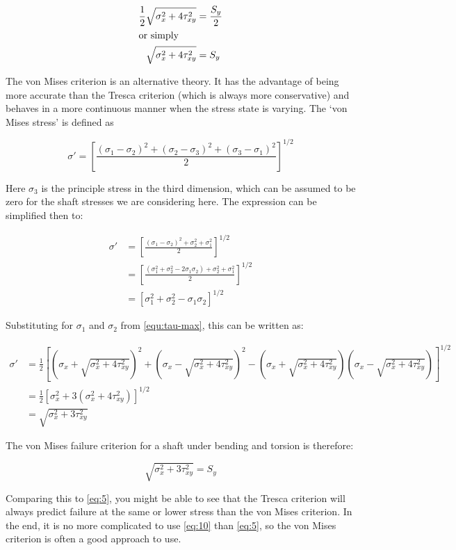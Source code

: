 \begin{align}
\label{eq:5}
\frac{1}{2} \sqrt{\sigma_x^2+4\tau_{xy}^2} &= \frac{S_y}{2} \\
              \intertext{or simply}
  \label{eq:tresca-failure}
\sqrt{\sigma_x^2+4\tau_{xy}^2} &= S_y
\end{align}

The von Mises criterion is an alternative
theory. It has the advantage of being more accurate than the Tresca criterion
(which is always more conservative) and behaves in a more continuous manner when
the stress state is varying. The `von Mises stress' is defined as

\begin{equation}
\label{eq:7}
\sigma' = \left[ \frac{ 
    \left( \sigma_1 - \sigma_2 \right)^2 +
    \left( \sigma_2 - \sigma_3 \right)^2 +
    \left( \sigma_3 - \sigma_1 \right)^2
  }{2} \right]^{1/2}
\end{equation}

Here $\sigma_3$ is the principle stress in the third dimension, which can be
assumed to be zero for the shaft stresses we are considering here. The
expression can be simplified then to:

\begin{align}
\label{eq:9}
  \sigma' &= \left[ \frac{ 
  \left( \sigma_1 - \sigma_2 \right)^2 + \sigma_2^2 + \sigma_1^2
  }{2} \right]^{1/2} \\
&= \left[ \frac{\left( \sigma_1^2 + \sigma_2^2 - 2 \sigma_1\sigma_2 \right) + \sigma_2^2 + \sigma_1^2}{2} \right]^{1/2} \\
          &= \left[ \sigma_1^2 + \sigma_2^2 - \sigma_1\sigma_2 \right]^{1/2} 
\end{align}

Substituting for $\sigma_1$ and $\sigma_2$ from \cref{equ:tau-max}, this can be written
as:

\begin{align}
\sigma' &= \frac{1}{2} \left[
          \left( \sigma_x + \sqrt{\sigma_x^2+4\tau_{xy}^2} \right)^2 +
          \left( \sigma_x - \sqrt{\sigma_x^2+4\tau_{xy}^2} \right)^2 -
          \left( \sigma_x + \sqrt{\sigma_x^2+4\tau_{xy}^2} \right)
          \left( \sigma_x - \sqrt{\sigma_x^2+4\tau_{xy}^2} \right)
          \right]^{1/2} \\
&= \frac{1}{2} \left[\sigma_x^2 + 3\left( \sigma_x^2+4\tau_{xy}^2 \right) \right]^{1/2} \\
  &= \sqrt{\sigma_x^2 + 3\tau_{xy}^2}
  \label{eq:8}
\end{align}

The von Mises failure criterion for a shaft under bending and torsion is
therefore:

\begin{equation}
\sqrt{\sigma_x^2 + 3\tau_{xy}^2} = S_y
\label{eq:10}
\end{equation}

Comparing this to \cref{eq:5}, you might be able to see that the Tresca
criterion will always predict failure at the same or lower stress than the von
Mises criterion. In the end, it is no more complicated to use \cref{eq:10} than
\cref{eq:5}, so the von Mises criterion is often a good approach to use.
